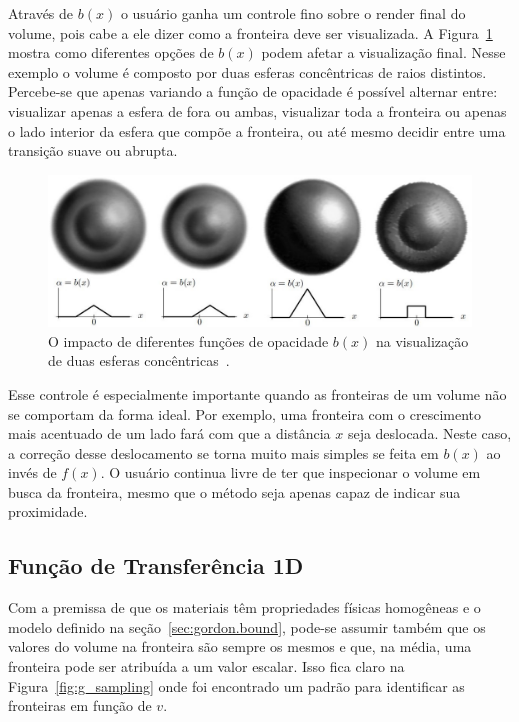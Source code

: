 	Através de $b(x)$ o usuário ganha um controle fino sobre o render final do volume, pois cabe a ele dizer como a fronteira deve ser visualizada. A Figura~\ref{fig:g_bx} mostra como diferentes opções de $b(x)$ podem afetar a visualização final. Nesse exemplo o volume é composto por duas esferas concêntricas de raios distintos. Percebe-se que apenas variando a função de opacidade é possível alternar entre: visualizar apenas a esfera de fora ou ambas, visualizar toda a fronteira ou apenas o lado interior da esfera que compõe a fronteira, ou até mesmo decidir entre uma transição suave ou abrupta.
	
\begin{figure}[h]
	\centering
	\includegraphics[width=1\textwidth]{images/g_bx}
	\caption{O impacto de diferentes funções de opacidade $b(x)$ na visualização de duas esferas concêntricas~\cite{gordon}.}
	\label{fig:g_bx}
\end{figure}

	Esse controle é especialmente importante quando as fronteiras de um volume não se comportam da forma ideal. Por exemplo, uma fronteira com o crescimento mais acentuado de um lado fará com que a distância $x$ seja deslocada. Neste caso, a correção desse deslocamento se torna muito mais simples se feita em $b(x)$ ao invés de $f(x)$. O usuário continua livre de ter que inspecionar o volume em busca da fronteira, mesmo que o método seja apenas capaz de indicar sua proximidade.
	
\subsection{Função de Transferência 1D}
\label{subsec:gordon.1d}
	Com a premissa de que os materiais têm propriedades físicas homogêneas e o modelo definido na seção~\ref{sec:gordon.bound}, pode-se assumir também que os valores do volume na fronteira são sempre os mesmos e que, na média, uma fronteira pode ser atribuída a um valor escalar. Isso fica claro na Figura~\ref{fig:g_sampling} onde foi encontrado um padrão para identificar as fronteiras em função de $v$.
	
